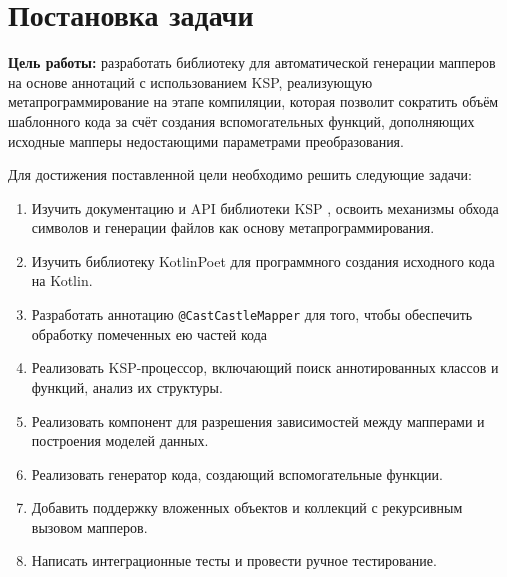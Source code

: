 \section{Постановка задачи}

\textbf{Цель работы:} разработать библиотеку для автоматической генерации мапперов на основе аннотаций с использованием KSP, реализующую метапрограммирование на этапе компиляции, которая позволит сократить объём шаблонного кода за счёт создания вспомогательных функций, дополняющих исходные мапперы недостающими параметрами преобразования.

Для достижения поставленной цели необходимо решить следующие задачи:

\begin{enumerate}
    \item Изучить документацию и API библиотеки KSP \cite{refg, refj}, освоить механизмы обхода символов и генерации файлов как основу метапрограммирования.
    \item Изучить библиотеку KotlinPoet \cite{refk} для программного создания исходного кода на Kotlin.
    \item Разработать аннотацию \texttt{@CastCastleMapper} для того, чтобы обеспечить обработку помеченных ею частей кода
    \item Реализовать KSP-процессор, включающий поиск аннотированных классов и функций, анализ их структуры.
    \item Реализовать компонент для разрешения зависимостей между мапперами и построения моделей данных.
    \item Реализовать генератор кода, создающий вспомогательные функции.
    \item Добавить поддержку вложенных объектов и коллекций с рекурсивным вызовом мапперов.
    \item Написать интеграционные тесты и провести ручное тестирование.
\end{enumerate}
